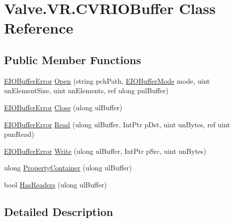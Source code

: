 \hypertarget{class_valve_1_1_v_r_1_1_c_v_r_i_o_buffer}{}\section{Valve.\+V\+R.\+C\+V\+R\+I\+O\+Buffer Class Reference}
\label{class_valve_1_1_v_r_1_1_c_v_r_i_o_buffer}
\subsection*{Public Member Functions}
\begin{DoxyCompactItemize}
\item 
\mbox{\hyperlink{namespace_valve_1_1_v_r_a11d6c73dbb80923b10779c007bb8c154}{E\+I\+O\+Buffer\+Error}} \mbox{\hyperlink{class_valve_1_1_v_r_1_1_c_v_r_i_o_buffer_a1a33f5cfebb49a7c2d2c13bbaccd1f3c}{Open}} (string pch\+Path, \mbox{\hyperlink{namespace_valve_1_1_v_r_a59487dd6eb3684570995a3bea405db2e}{E\+I\+O\+Buffer\+Mode}} mode, uint un\+Element\+Size, uint un\+Elements, ref ulong pul\+Buffer)
\item 
\mbox{\hyperlink{namespace_valve_1_1_v_r_a11d6c73dbb80923b10779c007bb8c154}{E\+I\+O\+Buffer\+Error}} \mbox{\hyperlink{class_valve_1_1_v_r_1_1_c_v_r_i_o_buffer_a1bb10ae0041902776ce2cc7399b5a554}{Close}} (ulong ul\+Buffer)
\item 
\mbox{\hyperlink{namespace_valve_1_1_v_r_a11d6c73dbb80923b10779c007bb8c154}{E\+I\+O\+Buffer\+Error}} \mbox{\hyperlink{class_valve_1_1_v_r_1_1_c_v_r_i_o_buffer_a852cd6742950d6f72fbe7e7a025d1c39}{Read}} (ulong ul\+Buffer, Int\+Ptr p\+Dst, uint un\+Bytes, ref uint pun\+Read)
\item 
\mbox{\hyperlink{namespace_valve_1_1_v_r_a11d6c73dbb80923b10779c007bb8c154}{E\+I\+O\+Buffer\+Error}} \mbox{\hyperlink{class_valve_1_1_v_r_1_1_c_v_r_i_o_buffer_ad122333f40ea2ee22b3948cc64a3208f}{Write}} (ulong ul\+Buffer, Int\+Ptr p\+Src, uint un\+Bytes)
\item 
ulong \mbox{\hyperlink{class_valve_1_1_v_r_1_1_c_v_r_i_o_buffer_a859f0b4fe21ce5c8581b84ba59f3a0fe}{Property\+Container}} (ulong ul\+Buffer)
\item 
bool \mbox{\hyperlink{class_valve_1_1_v_r_1_1_c_v_r_i_o_buffer_ae405356ee953b590aae67ed096add888}{Has\+Readers}} (ulong ul\+Buffer)
\end{DoxyCompactItemize}


\subsection{Detailed Description}


